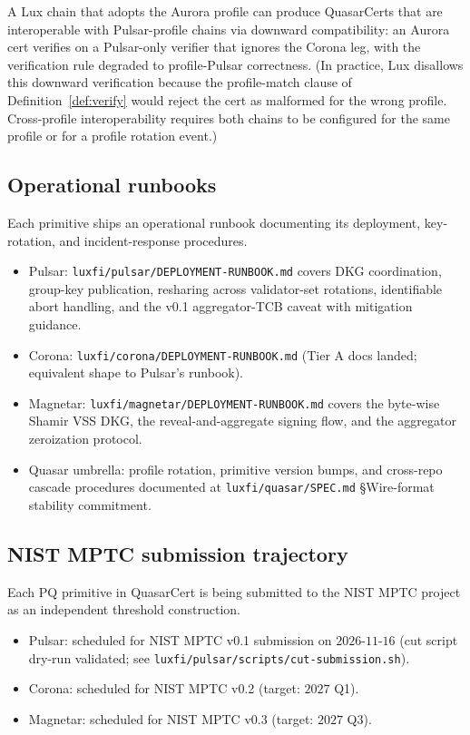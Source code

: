 A Lux chain that adopts the Aurora profile can produce QuasarCerts
that are interoperable with Pulsar-profile chains via downward
compatibility: an Aurora cert verifies on a Pulsar-only verifier
that ignores the Corona leg, with the verification rule degraded to
profile-Pulsar correctness. (In practice, Lux disallows this
downward verification because the profile-match clause of
Definition~\ref{def:verify} would reject the cert as malformed for
the wrong profile. Cross-profile interoperability requires both
chains to be configured for the same profile or for a profile
rotation event.)

\subsection{Operational runbooks}

Each primitive ships an operational runbook documenting its
deployment, key-rotation, and incident-response procedures.

\begin{itemize}[leftmargin=2em,nosep]
\item Pulsar: \texttt{luxfi/pulsar/DEPLOYMENT-RUNBOOK.md} covers DKG
      coordination, group-key publication, resharing across
      validator-set rotations, identifiable abort handling, and
      the v0.1 aggregator-TCB caveat with mitigation guidance.
\item Corona: \texttt{luxfi/corona/DEPLOYMENT-RUNBOOK.md} (Tier A
      docs landed; equivalent shape to Pulsar's runbook).
\item Magnetar: \texttt{luxfi/magnetar/DEPLOYMENT-RUNBOOK.md} covers
      the byte-wise Shamir VSS DKG, the reveal-and-aggregate signing
      flow, and the aggregator zeroization protocol.
\item Quasar umbrella: profile rotation, primitive version bumps,
      and cross-repo cascade procedures documented at
      \texttt{luxfi/quasar/SPEC.md} \S Wire-format stability commitment.
\end{itemize}

\subsection{NIST MPTC submission trajectory}

Each PQ primitive in QuasarCert is being submitted to the NIST
MPTC project \cite{nistir8214c} as an independent threshold
construction.

\begin{itemize}[leftmargin=2em,nosep]
\item Pulsar: scheduled for NIST MPTC v0.1 submission on
      $2026$-$11$-$16$ (cut script dry-run validated; see
      \texttt{luxfi/pulsar/scripts/cut-submission.sh}).
\item Corona: scheduled for NIST MPTC v0.2 (target: $2027$ Q1).
\item Magnetar: scheduled for NIST MPTC v0.3 (target: $2027$ Q3).
\end{itemize}

